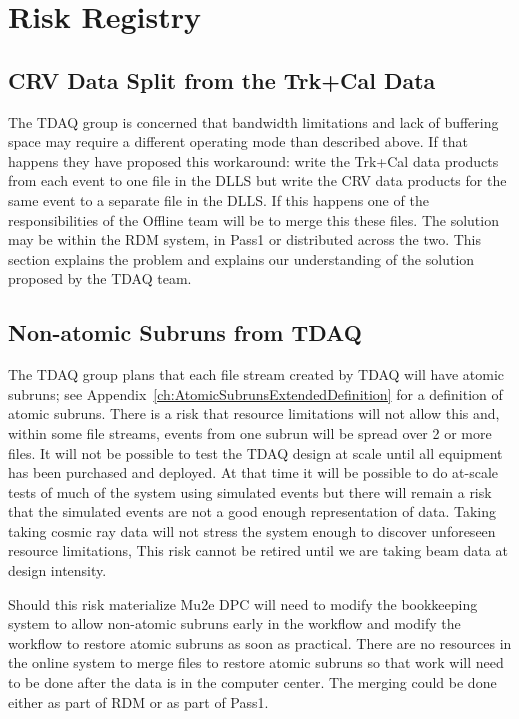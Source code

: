 \chapter{Risk Registry}
\label{ch:RiskRegistry}

\section{CRV Data Split from the Trk+Cal Data}
\label{sec:Risk:NonAtomicSubruns}

The TDAQ group is concerned that bandwidth limitations and lack of buffering
space may require a different operating mode than described above.  If that
happens they have proposed this workaround: write the Trk+Cal data products
from each event to one file in the DLLS but write the CRV data products for
the same event to a separate file in the DLLS.  If this happens one
of the responsibilities of the Offline team will be to merge this these files.
The solution may be within the RDM system, in Pass1 or distributed across the two.
This section explains the problem and explains our understanding of the solution
proposed by the TDAQ team.

\section{Non-atomic Subruns from TDAQ}
\label{sec:Risk:NonAtomicSubruns}

The TDAQ group plans that each file stream created by TDAQ will have atomic subruns;
see Appendix~\ref{ch:AtomicSubrunsExtendedDefinition} for a definition of atomic subruns.
There is a risk that resource limitations will not allow this and, within some file streams,
events from one subrun will be spread over 2 or more files.  It will not be possible
to test the TDAQ design at scale until all equipment has been purchased and deployed.
At that time it will be possible to do at-scale tests of much of the system using simulated events
but there will remain a risk that the simulated events are not a good enough representation of data.
Taking taking cosmic ray data will not stress the system enough to discover unforeseen resource limitations,
This risk cannot be retired until we are taking beam data at design intensity.

Should this risk materialize Mu2e DPC will need to modify the bookkeeping
system to allow non-atomic subruns early in the workflow and modify the workflow
to restore atomic subruns as soon as practical.
There are no resources in the online system to merge files to restore atomic subruns
so that work will need to be done after the data is in the computer center.
The merging could be done either as part of RDM or as part of Pass1.

